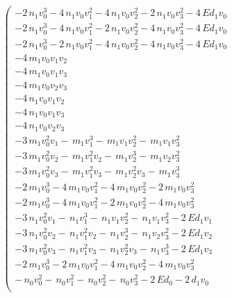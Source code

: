 \documentclass{article}
\begin{document}
\begin{equation}
\label{polynomial system}
\left(\begin{array}{r}
-2 \, n_{1} v_{0}^{3} - 4 \, n_{1} v_{0} v_{1}^{2} - 4 \, n_{1} v_{0} v_{2}^{2} - 2 \, n_{1} v_{0} v_{3}^{2} - 4 \, E d_{1} v_{0} \\
-2 \, n_{1} v_{0}^{3} - 4 \, n_{1} v_{0} v_{1}^{2} - 2 \, n_{1} v_{0} v_{2}^{2} - 4 \, n_{1} v_{0} v_{3}^{2} - 4 \, E d_{1} v_{0} \\
-2 \, n_{1} v_{0}^{3} - 2 \, n_{1} v_{0} v_{1}^{2} - 4 \, n_{1} v_{0} v_{2}^{2} - 4 \, n_{1} v_{0} v_{3}^{2} - 4 \, E d_{1} v_{0} \\
-4 \, m_{1} v_{0} v_{1} v_{2} \\
-4 \, m_{1} v_{0} v_{1} v_{3} \\
-4 \, m_{1} v_{0} v_{2} v_{3} \\
-4 \, n_{1} v_{0} v_{1} v_{2} \\
-4 \, n_{1} v_{0} v_{1} v_{3} \\
-4 \, n_{1} v_{0} v_{2} v_{3} \\
-3 \, m_{1} v_{0}^{2} v_{1} -  \, m_{1} v_{1}^{3} -  \, m_{1} v_{1} v_{2}^{2} -  \, m_{1} v_{1} v_{3}^{2} \\
-3 \, m_{1} v_{0}^{2} v_{2} -  \, m_{1} v_{1}^{2} v_{2} -  \, m_{1} v_{2}^{3} -  \, m_{1} v_{2} v_{3}^{2} \\
-3 \, m_{1} v_{0}^{2} v_{3} -  \, m_{1} v_{1}^{2} v_{3} -  \, m_{1} v_{2}^{2} v_{3} -  \, m_{1} v_{3}^{3} \\
-2 \, m_{1} v_{0}^{3} - 4 \, m_{1} v_{0} v_{1}^{2} - 4 \, m_{1} v_{0} v_{2}^{2} - 2 \, m_{1} v_{0} v_{3}^{2} \\
-2 \, m_{1} v_{0}^{3} - 4 \, m_{1} v_{0} v_{1}^{2} - 2 \, m_{1} v_{0} v_{2}^{2} - 4 \, m_{1} v_{0} v_{3}^{2} \\
-3 \, n_{1} v_{0}^{2} v_{1} -  \, n_{1} v_{1}^{3} -  \, n_{1} v_{1} v_{2}^{2} -  \, n_{1} v_{1} v_{3}^{2} - 2 \, E d_{1} v_{1} \\
-3 \, n_{1} v_{0}^{2} v_{2} -  \, n_{1} v_{1}^{2} v_{2} -  \, n_{1} v_{2}^{3} -  \, n_{1} v_{2} v_{3}^{2} - 2 \, E d_{1} v_{2} \\
-3 \, n_{1} v_{0}^{2} v_{3} -  \, n_{1} v_{1}^{2} v_{3} -  \, n_{1} v_{2}^{2} v_{3} -  \, n_{1} v_{3}^{3} - 2 \, E d_{1} v_{3} \\
-2 \, m_{1} v_{0}^{3} - 2 \, m_{1} v_{0} v_{1}^{2} - 4 \, m_{1} v_{0} v_{2}^{2} - 4 \, m_{1} v_{0} v_{3}^{2} \\
- \, n_{0} v_{0}^{2} -  \, n_{0} v_{1}^{2} -  \, n_{0} v_{2}^{2} -  \, n_{0} v_{3}^{2} - 2 \, E d_{0} - 2 \, d_{1} v_{0} \\

\end{array}
\end{equation}
\end{document}
